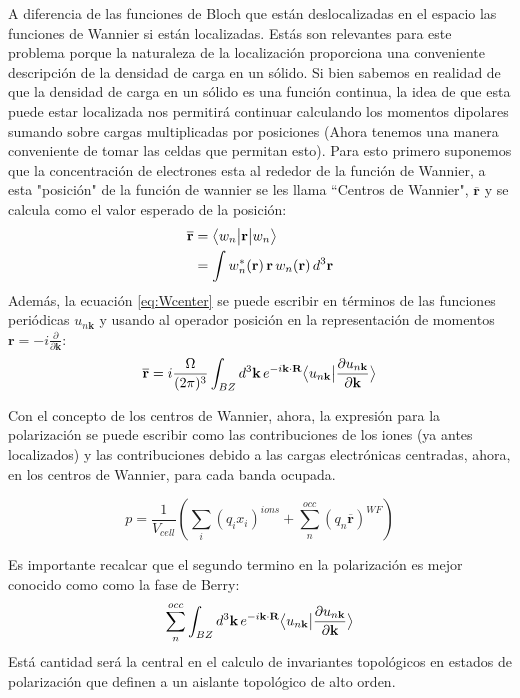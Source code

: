 A diferencia de las funciones de Bloch que están deslocalizadas en el espacio las funciones de Wannier si están localizadas. Estás son relevantes para este problema porque la naturaleza de la localización proporciona una conveniente descripción de la densidad de carga en un sólido. Si bien sabemos en
realidad de que la densidad de carga en un sólido es una función continua, la idea de que esta puede estar localizada nos permitirá continuar calculando los momentos dipolares sumando sobre cargas multiplicadas por posiciones (Ahora tenemos una manera conveniente de tomar las celdas que permitan esto).
Para esto primero suponemos que la concentración de electrones esta al rededor de la función de Wannier, a esta "posición" de la función de wannier se les llama ``Centros de Wannier", $\overline{\textbf{r}}$ y se calcula como el valor esperado de la posición:
\begin{equation}
\label{eq:Wcenter}
\begin{split}
        \overline{\textbf{r}} &= \big \langle{w_n}\big | {\textbf{r}} \big | {w_n} \big \rangle\\
        &= \int w^*_n(\textbf{r})\,\textbf{r}\, w_n(\textbf{r})\, d^3\textbf{r}
\end{split}
\end{equation}
 Además, la ecuación \eqref{eq:Wcenter} se puede escribir en términos de las funciones periódicas $u_{n\textbf{k}}$ y usando al operador posición en la representación de momentos $\textbf{r} = -i\frac{\partial}{\partial\textbf{k}}$:
\begin{equation}
    \overline{\textbf{r}} = i\frac{\Omega}{(2\pi)^3} \int_{BZ} d^3\textbf{k}\,e^{-i\textbf{k}\cdot\textbf{R}}\big \langle{u_{n\textbf{k}}}\big | {\frac{\partial u_{n\textbf{k}} }{\partial\textbf{k}}} \big \rangle
\end{equation}

Con el concepto de los centros de Wannier, ahora, la expresión para la polarización se puede escribir como las contribuciones de los iones (ya antes localizados) y las contribuciones debido a las cargas electrónicas centradas, ahora, en los centros de Wannier, para cada banda ocupada.

\begin{equation}
    p = \frac{1}{V_{cell}} (\sum_i (q_i x_i)^{ions} + \sum_n^{occ}(q_n \overline{\textbf{r}})^{WF})
\end{equation}

Es importante recalcar que el segundo termino en la polarización es mejor conocido como como la fase de Berry:
\begin{equation}
    \label{eq:Barry_fase}
    \sum_n^{occ}\int_{BZ} d^3\textbf{k}\,e^{-i\textbf{k}\cdot\textbf{R}}\big \langle{u_{n\textbf{k}}}\big | {\frac{\partial u_{n\textbf{k}} }{\partial\textbf{k}}} \big \rangle
\end{equation}
Está cantidad será la central en el calculo de invariantes topológicos en estados de polarización que definen a un aislante topológico de alto orden. 


